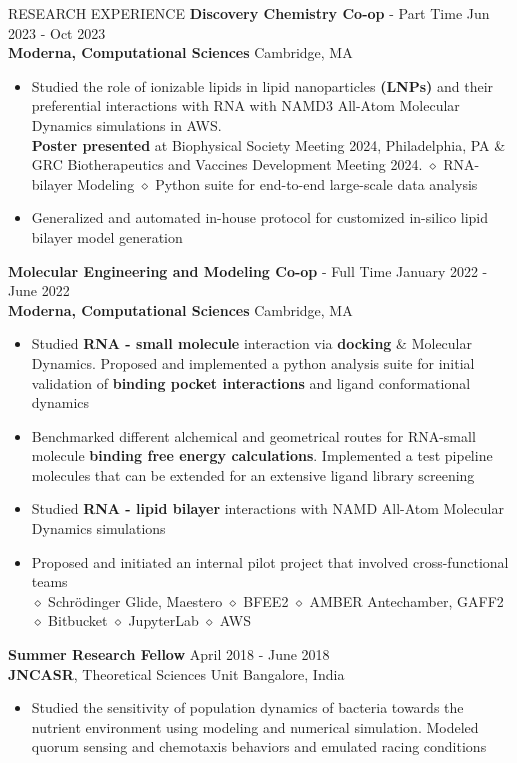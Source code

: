 \documentclass{resume} %
\begin{document}
\begin{rSection}{RESEARCH EXPERIENCE}
   \textbf{Discovery Chemistry Co-op} - Part Time \hfill Jun 2023 - Oct 2023\\
   \textbf{Moderna, Computational Sciences} \hfill {Cambridge, MA}
   \begin{itemize}
      \itemsep -1pt {}
      \item Studied the role of ionizable lipids in lipid nanoparticles \textbf{(LNPs)} and their preferential interactions with RNA with NAMD3 All-Atom Molecular Dynamics simulations in AWS.\\
            \textbf{Poster presented} at Biophysical Society Meeting 2024, Philadelphia, PA \& GRC Biotherapeutics and Vaccines Development Meeting 2024.
            $\diamond$ RNA-bilayer Modeling $\diamond$ Python suite for end-to-end large-scale data analysis
      \item Generalized and automated in-house protocol for customized in-silico lipid bilayer model generation
   \end{itemize}

   \textbf{Molecular Engineering and Modeling Co-op} - Full Time \hfill January 2022 - June 2022\\
   \textbf{Moderna, Computational Sciences} \hfill {Cambridge, MA}
   \begin{itemize}
      \itemsep -1pt {}
      \item Studied \textbf{RNA - small molecule} interaction via \textbf{docking} $\&$ Molecular Dynamics. Proposed and implemented a python analysis suite for initial validation of \textbf{binding pocket interactions} and ligand conformational dynamics
      \item Benchmarked different alchemical and geometrical routes for RNA-small molecule \textbf{binding free energy calculations}. Implemented a test pipeline molecules that can be extended for an extensive ligand library screening
      \item Studied \textbf{RNA - lipid bilayer} interactions with NAMD All-Atom Molecular Dynamics simulations
      \item  Proposed and initiated an internal pilot project that involved cross-functional teams \\
            $\diamond$ Schr{\"o}dinger Glide, Maestero $\diamond$  BFEE2 $\diamond$ AMBER Antechamber, GAFF2 $\diamond$ Bitbucket $\diamond$ JupyterLab $\diamond$ AWS
   \end{itemize}

   \textbf{Summer Research Fellow} \hfill April 2018 - June 2018\\
   \textbf{JNCASR}, Theoretical Sciences Unit \hfill {Bangalore, India}
   \begin{itemize}
      \itemsep -1pt {}
      \item Studied the sensitivity of population dynamics of bacteria towards the nutrient environment using modeling and numerical simulation. Modeled quorum sensing and chemotaxis behaviors and emulated racing conditions
   \end{itemize}


\end{rSection}
\end{document}
